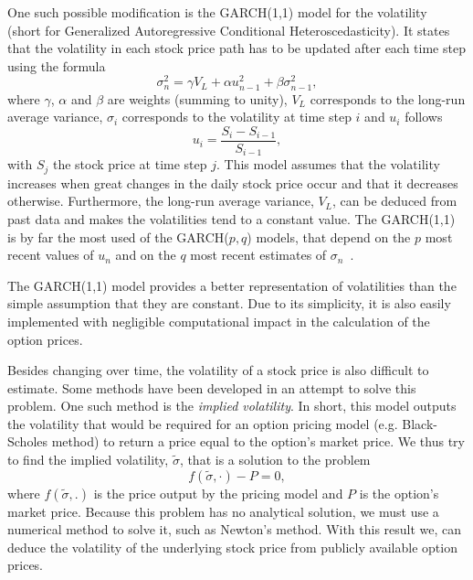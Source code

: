 \documentclass[a4paper,twocolumn,aps,prd,longbibliography,superscriptaddress]{revtex4-1}
\begin{document}
One such possible modification is the GARCH(1,1) model for the volatility~\cite{Wei} (short for Generalized Autoregressive Conditional Heteroscedasticity).
It states that the volatility in each stock price path has to be updated after each time step using the formula
\begin{equation}
\sigma_n^2=\gamma V_L+\alpha u_{n-1}^2+\beta\sigma_{n-1}^2,
\end{equation}
\noindent where $\gamma$, $\alpha$ and $\beta$ are weights (summing to unity), $V_L$ corresponds to the long-run average variance, $\sigma_i$ corresponds to the volatility at time step $i$ and $u_i$ follows
\begin{equation}
u_i=\frac{S_i-S_{i-1}}{S_{i-1}},
\end{equation}
\noindent with $S_j$ the stock price at time step $j$.
This model assumes that the volatility increases when great changes in the daily stock price occur and that it decreases otherwise. Furthermore, the long-run average variance, $V_L$, can be deduced from past data and makes the volatilities tend to a constant value.
The GARCH(1,1) is by far the most used of the GARCH($p,q$) models, that depend on the $p$ most recent values of $u_n$ and on the $q$ most recent estimates of $\sigma_n$~\citep{Hull}.

The GARCH(1,1) model provides a better representation of volatilities than the simple assumption that they are constant. Due to its simplicity, it is also easily implemented with negligible computational impact in the calculation of the option prices.

Besides changing over time, the volatility of a stock price is also difficult to estimate. Some methods have been developed in an attempt to solve this problem. One such method is the \textit{implied volatility}. In short, this model outputs the volatility that would be required for an option pricing model (e.g. Black-Scholes method) to return a price equal to the option's market price.
We thus try to find the implied volatility, $\widetilde{\sigma}$, that is a solution to the problem
\begin{equation}
f(\widetilde{\sigma},\cdot)-P=0,
\end{equation}
\noindent where $f(\widetilde{\sigma},.)$ is the price output by the pricing model and $P$ is the option's market price.
Because this problem has no analytical solution, we must use a numerical method to solve it, such as Newton's method.
With this result we, can deduce the volatility of the underlying stock price from publicly available option prices.
\end{document}
